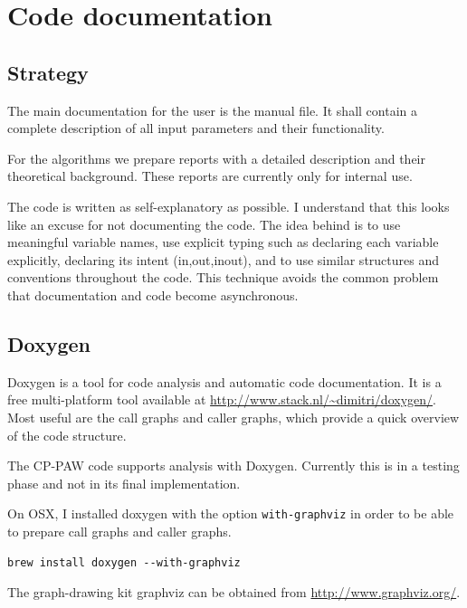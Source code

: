 \documentclass[final,12pt]{article}
\begin{document}
{{{{{{\section{Code documentation}
\subsection{Strategy}
The main documentation for the user is the manual file. It shall
contain a complete description of all input parameters and their
functionality.

For the algorithms we prepare reports with a detailed description and
their theoretical background. These reports are currently only for
internal use. 

The code is written as self-explanatory as possible. I understand that
this looks like an excuse for not documenting the code. The idea
behind is to use meaningful variable names, use explicit typing such
as declaring each variable explicitly, declaring its intent
(in,out,inout), and to use similar structures and conventions
throughout the code. This technique avoids the common problem that
documentation and code become asynchronous.

\subsection{Doxygen}
Doxygen is a tool for code analysis and automatic code
documentation. It is a free multi-platform tool available at
\url{http://www.stack.nl/~dimitri/doxygen/}. Most useful are the call
graphs and caller graphs, which provide a quick overview of the code
structure.

The CP-PAW code supports analysis with Doxygen. Currently this is in a
testing phase and not in its final implementation. 

On OSX, I installed doxygen with the option \verb|with-graphviz| in
order to be able to prepare call graphs and caller graphs. 
\begin{verbatim} 
brew install doxygen --with-graphviz
\end{verbatim}
The graph-drawing kit graphviz can be obtained from
\url{http://www.graphviz.org/}.

}}}}}}
\end{document}
